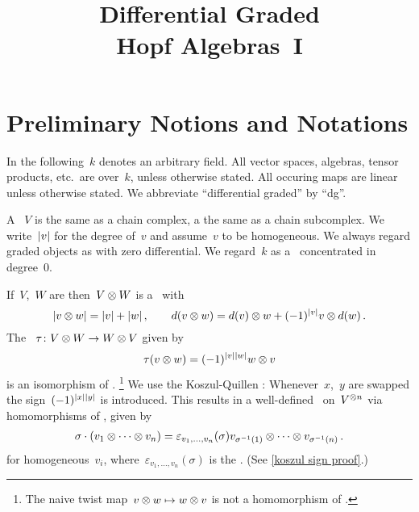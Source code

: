 \documentclass[a4paper,10pt,headings=standardclasses]{scrartcl}
\title{Differential Graded \\ Hopf Algebras~I}
\author{}
\date{}
\begin{document}
\maketitle

\vspace{-4em}





\section{Preliminary Notions and Notations}
\label{notions and notations}

In the following~$k$ denotes an arbitrary field.
All vector spaces, algebras, tensor products, etc.\ are over~$k$, unless otherwise stated.
All occuring maps are linear unless otherwise stated.
We abbreviate \enquote{differential graded} by \enquote{dg}.

A ~$V$ is the same as a chain complex, a  the same as a chain subcomplex.
We write~$\lvert v\rvert$ for the degree of~$v$ and assume~$v$ to be homogeneous.
We always regard graded objects as {\dgos} with zero differential.
We regard~$k$ as a~{\dgv} concentrated in degree~$0$.

If~$V$,~$W$ are {\dgvs} then~$V \otimes W$ is a {\dgv}~with
\[
  \lvert v \otimes w\rvert
  =
  \lvert v\rvert + \lvert w\rvert \,,
  \qquad
  d(v \otimes w)
  =
  d(v) \otimes w + (-1)^{\lvert v\rvert} v \otimes d(w) \,.
\]
The ~$\tau \colon V \otimes W \to W \otimes V$ given by
\[
  \tau(v \otimes w)
  =
  (-1)^{\lvert v\rvert \lvert w\rvert}
  w \otimes v
\]
is an isomorphism of {\dgvs}.%
\footnote{The naive twist map~$v \otimes w \mapsto w \otimes v$ is not a homomorphism of {\dgvs}.}
We use the Koszul-Quillen :
Whenever~$x$,~$y$ are swapped the sign~$(-1)^{\lvert x\rvert \lvert y\rvert}$ is introduced.
This results in a well-defined~{} on~$V^{\otimes n}$ via homomorphisms of {\dgvs}, given by
\begin{gather*}
  \sigma \cdot (v_1 \otimes \dotsb \otimes v_n)
  =
  \varepsilon_{v_1, \dotsc, v_n}(\sigma)
  v_{\sigma^{-1}(1)} \otimes \dotsb \otimes v_{\sigma^{-1}(n)} \,.
\end{gather*}
for homogeneous~$v_i$, where~$\varepsilon_{v_1, \dotsc, v_n}(\sigma)$ is the .
(See \cref{koszul sign proof}.)
\end{document}
